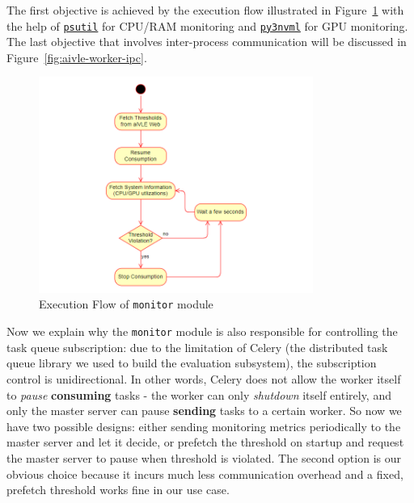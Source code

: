 The first objective is achieved by the execution flow illustrated in Figure~\ref{fig:aivle-worker-monitor-flow} with the help of \href{https://pypi.org/project/psutil/}{\texttt{psutil}} for CPU/RAM monitoring and \href{https://github.com/fbcotter/py3nvml}{\texttt{py3nvml}} for GPU monitoring. The last objective that involves inter-process communication will be discussed in Figure~\ref{fig:aivle-worker-ipc}.

\begin{figure}[H]
    \centering
    \includegraphics[width=0.8\textwidth]{images/aivle-worker-monitor-flow.png}
    \caption{Execution Flow of \texttt{monitor} module}
    \label{fig:aivle-worker-monitor-flow}
\end{figure}

Now we explain why the \texttt{monitor} module is also responsible for controlling the task queue subscription: due to the limitation of Celery (the distributed task queue library we used to build the evaluation subsystem), the subscription control is unidirectional. In other words, Celery does not allow the worker itself to \emph{pause} \textbf{consuming} tasks - the worker can only \emph{shutdown} itself entirely, and only the master server can pause \textbf{sending} tasks to a certain worker. So now we have two possible designs: either sending monitoring metrics periodically to the master server and let it decide, or prefetch the threshold on startup and request the master server to pause when threshold is violated. The second option is our obvious choice because it incurs much less communication overhead and a fixed, prefetch threshold works fine in our use case.

